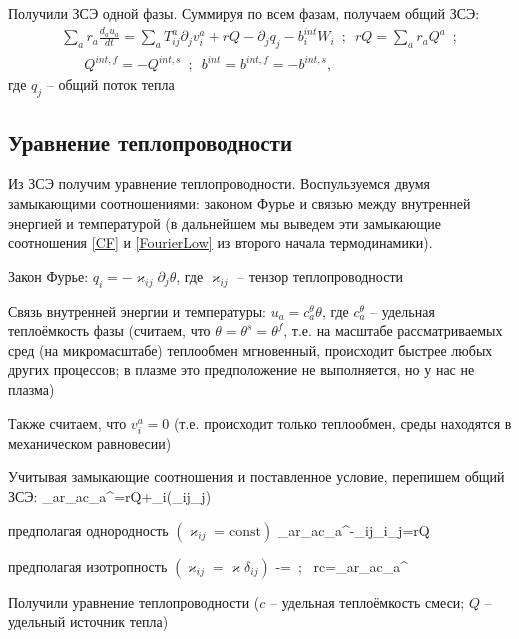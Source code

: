 \documentclass[main.tex]{subfiles}
\begin{document}
Получили ЗСЭ одной фазы. Суммируя по всем фазам, получаем общий ЗСЭ:
\begin{multline}
\sum\limits_{a}{r_a\frac{d_au_a}{dt}}=\sum\limits_{a}{T_{ij}^a\partial_jv_i^a+rQ-\partial_jq_j-b_i^{int}W_i}\,\,\,;\,\,\,rQ=\sum\limits_{a}{r_aQ^a}\,\,\,;\\ \,\,\,\,\,\,\,\,\,\,Q^{int,f}=-Q^{int,s}\,\,\,;\,\,\,b^{int}=b^{int,f}=-b^{int,s},
\end{multline}
где $q_j$ -- общий поток тепла

\subsection{Уравнение теплопроводности}

Из ЗСЭ получим уравнение теплопроводности. Воспульзуемся двумя замыкающими соотношениями: законом Фурье и связью между внутренней энергией и температурой (в дальнейшем мы выведем эти замыкающие соотношения \eqref{CF} и \eqref{FourierLow} из второго начала термодинамики).

Закон Фурье: $q_i=-\varkappa_{ij}\partial_j\theta$, где $\varkappa_{ij}$ -- тензор теплопроводности

Связь внутренней энергии и температуры: $u_a=c_a^\theta\theta$, где $c_a^\theta$ -- удельная теплоёмкость фазы (считаем, что $\theta=\theta^s=\theta^f$, т.е. на масштабе рассматриваемых сред (на микромасштабе) теплообмен мгновенный, происходит быстрее любых других процессов; в плазме это предположение не выполняется, но у нас не плазма)

Также считаем, что $v_i^a=0$ (т.е. происходит только теплообмен, среды находятся в механическом равновесии)

Учитывая замыкающие соотношения и поставленное условие, перепишем общий ЗСЭ:
\beq\label{HT}
\sum\limits_{a}{r_ac_a^\theta{}}=rQ+\partial_i\left(\varkappa_{ij}\partial_j\theta\right)
\eeq

предполагая однородность $\left(\varkappa_{ij}=\text{const}\right)$
\beq\label{HeatTransfer}
\sum\limits_{a}{r_ac_a^\theta{}}-\varkappa_{ij}\partial_i\partial_j\theta=rQ
\eeq

предполагая изотропность $\left(\varkappa_{ij}=\varkappa\delta_{ij}\right)$
\beq
{}-\Delta\theta=\,\,\,;\,\,\, rc=\sum\limits_{a}{r_ac_a^\theta}
\eeq

Получили уравнение теплопроводности ($c$ -- удельная теплоёмкость смеси; $Q$ -- удельный источник тепла)
\end{document}
